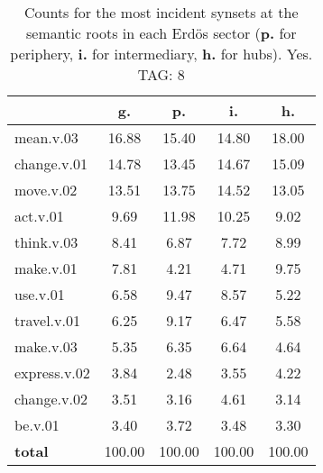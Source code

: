 \begin{table}[h!]
\begin{center}
\begin{tabular}{| l | c | c | c | c |}\hline
 & g. & p. & i. & h. \\\hline
mean.v.03 & 16.88  & 15.40  & 14.80  & 18.00 \\\hline
change.v.01 & 14.78  & 13.45  & 14.67  & 15.09 \\\hline
move.v.02 & 13.51  & 13.75  & 14.52  & 13.05 \\\hline
act.v.01 & 9.69  & 11.98  & 10.25  & 9.02 \\\hline
think.v.03 & 8.41  & 6.87  & 7.72  & 8.99 \\\hline
make.v.01 & 7.81  & 4.21  & 4.71  & 9.75 \\\hline
use.v.01 & 6.58  & 9.47  & 8.57  & 5.22 \\\hline
travel.v.01 & 6.25  & 9.17  & 6.47  & 5.58 \\\hline
make.v.03 & 5.35  & 6.35  & 6.64  & 4.64 \\\hline
express.v.02 & 3.84  & 2.48  & 3.55  & 4.22 \\\hline
change.v.02 & 3.51  & 3.16  & 4.61  & 3.14 \\\hline
be.v.01 & 3.40  & 3.72  & 3.48  & 3.30 \\\hline
{{\bf total}} & 100.00  & 100.00  & 100.00  & 100.00 \\\hline
\end{tabular}
\caption{Counts for the most incident synsets at the semantic roots in each Erd\"os sector ({\bf p.} for periphery, {\bf i.} for intermediary, {\bf h.} for hubs). Yes. TAG: 8}
\end{center}
\end{table}